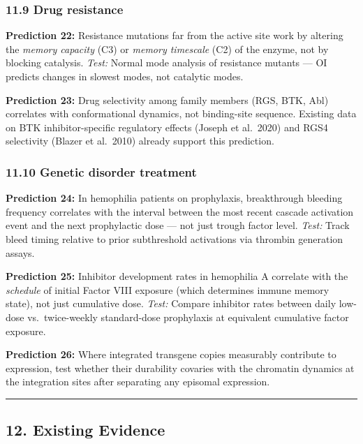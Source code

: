 \documentclass[
]{article}
\begin{document}
\hypertarget{drug-resistance}{%
\subsubsection{11.9 Drug resistance}\label{drug-resistance}}

\textbf{Prediction 22:} Resistance mutations far from the active site
work by altering the \emph{memory capacity} (C3) or \emph{memory
timescale} (C2) of the enzyme, not by blocking catalysis. \emph{Test:}
Normal mode analysis of resistance mutants --- OI predicts changes in
slowest modes, not catalytic modes.

\textbf{Prediction 23:} Drug selectivity among family members (RGS, BTK,
Abl) correlates with conformational dynamics, not binding-site sequence.
Existing data on BTK inhibitor-specific regulatory effects (Joseph et
al.~2020) and RGS4 selectivity (Blazer et al.~2010) already support this
prediction.

\hypertarget{genetic-disorder-treatment}{%
\subsubsection{11.10 Genetic disorder
treatment}\label{genetic-disorder-treatment}}

\textbf{Prediction 24:} In hemophilia patients on prophylaxis,
breakthrough bleeding frequency correlates with the interval between the
most recent cascade activation event and the next prophylactic dose ---
not just trough factor level. \emph{Test:} Track bleed timing relative
to prior subthreshold activations via thrombin generation assays.

\textbf{Prediction 25:} Inhibitor development rates in hemophilia A
correlate with the \emph{schedule} of initial Factor VIII exposure
(which determines immune memory state), not just cumulative dose.
\emph{Test:} Compare inhibitor rates between daily low-dose
vs.~twice-weekly standard-dose prophylaxis at equivalent cumulative
factor exposure.

\textbf{Prediction 26:} Where integrated transgene copies measurably
contribute to expression, test whether their durability covaries with
the chromatin dynamics at the integration sites after separating any
episomal expression.

\begin{center}\rule{0.5\linewidth}{0.5pt}\end{center}

\hypertarget{existing-evidence}{%
\subsection{12. Existing Evidence}\label{existing-evidence}}
\end{document}
